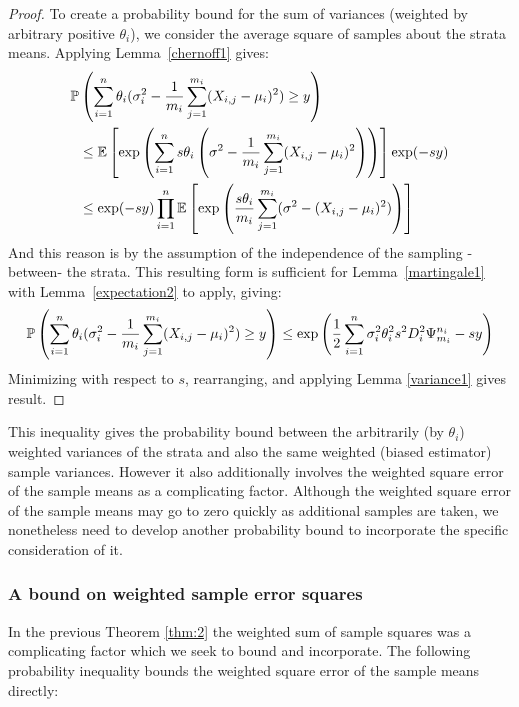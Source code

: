 \begin{proof}
To create a probability bound for the sum of variances (weighted by arbitrary positive $\theta_i$), we consider the average square of samples about the strata means. 
Applying Lemma~\ref{chernoff1} gives:
\begin{align*} 
\operatorname{\mathbb{P}}&\left(\sum_{i=1}^n\theta_i(\sigma_i^2-\frac{1}{m_i}\sum_{j=1}^{m_i}(X_{i,j}-\mu_i)^2)\ge y\right) \\
&\le \operatorname{\mathbb{E}}\left[\exp\left(\sum_{i=1}^ns\theta_i\left(\sigma^2-\frac{1}{m_i}\sum_{j=1}^{m_i}(X_{i,j}-\mu_i)^2\right)\right)\right]\exp(-sy)\\
& \le \exp(-sy)\prod_{i=1}^n\operatorname{\mathbb{E}}\left[\exp\left(\frac{s\theta_i}{m_i}\sum_{j=1}^{m_i}(\sigma^2-(X_{i,j}-\mu_i)^2)\right)\right] 
\end{align*}
And this reason is by the assumption of the independence of the sampling -between- the strata. 
This resulting form is sufficient for Lemma~\ref{martingale1} with Lemma~\ref{expectation2} to apply, giving:
$$ \operatorname{\mathbb{P}}\left(\sum_{i=1}^n\theta_i(\sigma_i^2-\frac{1}{m_i}\sum_{j=1}^{m_i}(X_{i,j}-\mu_i)^2)\ge y\right) \le \exp\left(\frac{1}{2}\sum_{i=1}^n\sigma_i^2\theta_i^2s^2D_i^2\Psi_{m_i}^{n_i}-sy\right)$$
Minimizing with respect to $s$, rearranging, and applying Lemma \ref{variance1} gives result.
\end{proof}

This inequality gives the probability bound between the arbitrarily (by $\theta_i$) weighted variances of the strata and also the same weighted (biased estimator) sample variances.
However it also additionally involves the weighted square error of the sample means as a complicating factor.
Although the weighted square error of the sample means may go to zero quickly as additional samples are taken, we nonetheless need to develop another probability bound to incorporate the specific consideration of it.

\subsubsection{A bound on weighted sample error squares}\label{subsubsection:a_bound_on_sample_squares}

In the previous Theorem \ref{thm:2} the weighted sum of sample squares was a complicating factor which we seek to bound and incorporate. The following probability inequality bounds the weighted square error of the sample means directly:

